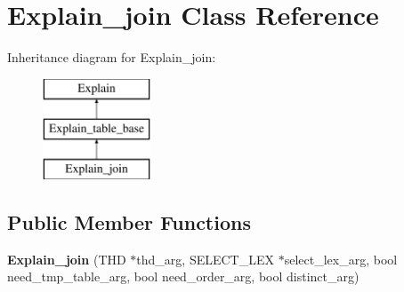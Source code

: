 \hypertarget{classExplain__join}{}\section{Explain\+\_\+join Class Reference}
\label{classExplain__join}
Inheritance diagram for Explain\+\_\+join\+:\begin{figure}[H]
\begin{center}
\leavevmode
\includegraphics[height=3.000000cm]{classExplain__join}
\end{center}
\end{figure}
\subsection*{Public Member Functions}
\begin{DoxyCompactItemize}
\item 
\mbox{\label{classExplain__join_ac81dc2369b4ee475cdd6d08459f63f90}} 
{\bfseries Explain\+\_\+join} (T\+HD $\ast$thd\+\_\+arg, S\+E\+L\+E\+C\+T\+\_\+\+L\+EX $\ast$select\+\_\+lex\+\_\+arg, bool need\+\_\+tmp\+\_\+table\+\_\+arg, bool need\+\_\+order\+\_\+arg, bool distinct\+\_\+arg)
\end{DoxyCompactItemize}
